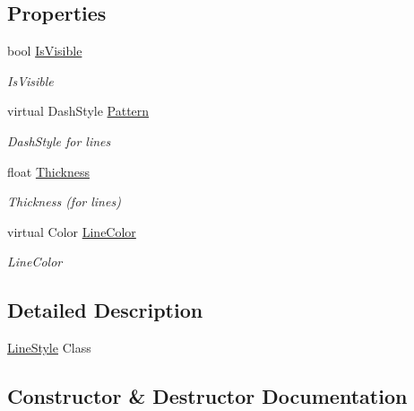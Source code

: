 \subsection*{Properties}
\begin{DoxyCompactItemize}
\item 
bool \mbox{\hyperlink{class_c_s_i_1_1_library_1_1_plotting_lib_1_1_line_style_a1f97a9f130464ef1c04e0f47b9fc7d53}{Is\+Visible}}
\begin{DoxyCompactList}\small\item\em Is\+Visible \end{DoxyCompactList}\item 
virtual Dash\+Style \mbox{\hyperlink{class_c_s_i_1_1_library_1_1_plotting_lib_1_1_line_style_ab2ae949671bd29572a44936094b8d028}{Pattern}}
\begin{DoxyCompactList}\small\item\em Dash\+Style for lines \end{DoxyCompactList}\item 
float \mbox{\hyperlink{class_c_s_i_1_1_library_1_1_plotting_lib_1_1_line_style_a4de96dad3cc7e7edc0efcffbde6cfef7}{Thickness}}
\begin{DoxyCompactList}\small\item\em Thickness (for lines) \end{DoxyCompactList}\item 
virtual Color \mbox{\hyperlink{class_c_s_i_1_1_library_1_1_plotting_lib_1_1_line_style_a5d82075b571474553f7bed15c5129a53}{Line\+Color}}
\begin{DoxyCompactList}\small\item\em Line\+Color \end{DoxyCompactList}\end{DoxyCompactItemize}


\subsection{Detailed Description}
\mbox{\hyperlink{class_c_s_i_1_1_library_1_1_plotting_lib_1_1_line_style}{Line\+Style}} Class 



\subsection{Constructor \& Destructor Documentation}
\mbox{\label{class_c_s_i_1_1_library_1_1_plotting_lib_1_1_line_style_a231d4fdddeff7d5b095600bfecc9100d}} 
